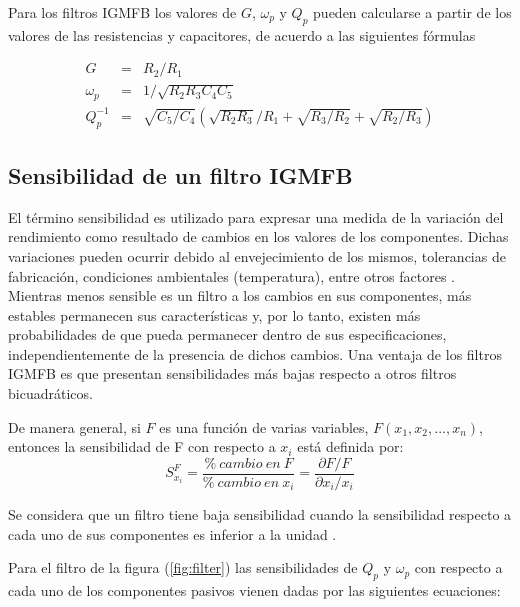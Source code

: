 \documentclass{llncs}
\begin{document}
	Para los filtros IGMFB los valores de $G$, $\omega_p$ y $Q_p$ pueden calcularse a partir
	de los valores de las resistencias y capacitores, de acuerdo a las siguientes fórmulas
	
	\begin{eqnarray}
		G &=& R_2/R_1 \label{defG} \\
		\omega_p &=& 1/\sqrt{R_2 R_3 C_4 C_5} \label{defOmega} \\
		Q^{-1}_p &=& \sqrt{C_5/C_4}  \left(\sqrt{R_2 R_3}/R_1 + \sqrt{R_3/R_2} +
		\sqrt{R_2/R_3}\right) \label{defQ}
	\end{eqnarray}
	
	\subsection{Sensibilidad de un filtro IGMFB}
	\label{subsec:sensFiltro}
	El término sensibilidad es utilizado para expresar una medida de
	la variación del rendimiento como resultado de cambios en los valores de los
	componentes. Dichas variaciones pueden ocurrir debido al envejecimiento de los
	mismos, tolerancias de fabricación, condiciones ambientales (temperatura), entre
	otros factores \cite{dim,rau:swa}. Mientras menos sensible es un filtro a los cambios en sus
	componentes, más estables permanecen sus características y, por lo tanto, existen más
	probabilidades de que pueda permanecer dentro de sus especificaciones,
	independientemente de la presencia de dichos cambios. Una ventaja de los filtros IGMFB es
	que presentan sensibilidades más bajas respecto a otros filtros bicuadráticos.
	
	De manera general, si $F$ es una función de varias variables, $F(x_1, x_2,...,x_n)$, entonces
	la sensibilidad de F con respecto a $x_i$ está definida por:
	\begin{equation}
		S_{x_i}^F = \frac{\%\ cambio\ en\ F}{\%\ cambio\ en\ x_i} = \frac{\partial F/F}{\partial x_i/x_i}
		\label{sensibilidad}
	\end{equation}
	
	Se considera que un filtro tiene baja sensibilidad cuando la sensibilidad respecto a cada uno
	de sus componentes es inferior a la unidad \cite{rau:swa}.
	
	Para el filtro de la figura (\ref{fig:filter}) las sensibilidades de $Q_p$ y $\omega_p$ con respecto a cada uno 
	de los componentes pasivos vienen dadas por las siguientes ecuaciones:
	
\end{document}
